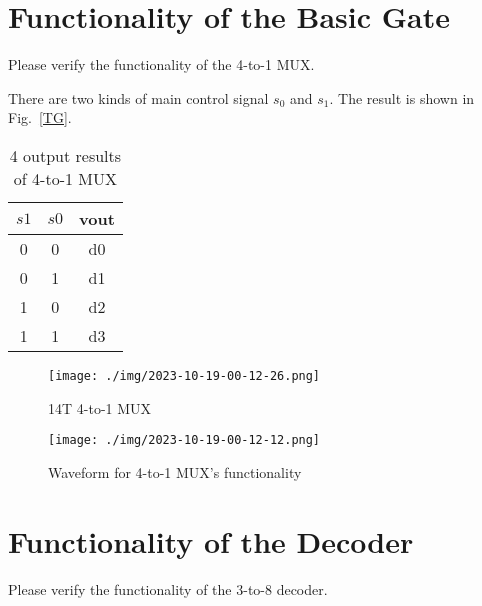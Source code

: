 \documentclass{article}
\begin{document}
\section{ Functionality of the Basic Gate}

Please verify the functionality of the 4-to-1 MUX.

There are two kinds of main control signal $s_0$ and $s_1$. The result is shown in Fig.~\ref{TG}.

\begin{table}[H]
    \centering\large
    \caption{4 output results of 4-to-1 MUX}
    \begin{tabular}{|c|c|c|}
        \hline
        \textbf{$s1$} & \textbf{$s0$} & \textbf{vout}  \\
        \hline
        0 & 0 & d0\\
        \hline
        0 & 1 & d1\\
        \hline
        1 & 0 & d2\\
        \hline
        1 & 1 & d3\\ \hline
    \end{tabular}
    \label{mux}
\end{table}

\begin{figure}[H]
    \centering
    \begin{minipage}[t]{0.35\textwidth}
    \centering
        \texttt{[image: ./img/2023-10-19-00-12-26.png]}
    \caption{14T 4-to-1 MUX}
    \label{mux1}
    \end{minipage}
    \qquad
    \begin{minipage}[t]{0.6\textwidth}
    \centering
        \texttt{[image: ./img/2023-10-19-00-12-12.png]}
    \caption{Waveform for 4-to-1 MUX's functionality}
    \label{mux2}
    \end{minipage}
\end{figure}

\section{Functionality of the Decoder}

Please verify the functionality of the 3-to-8 decoder.
\end{document}
